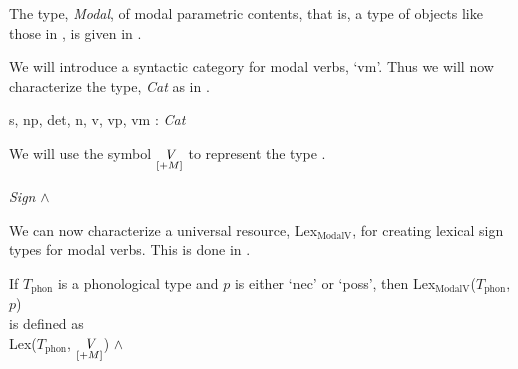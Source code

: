 The type, \textit{Modal}, of modal parametric contents, that is, a
type of objects like those in \preveg{}, is given in \nexteg{}.
\begin{ex} 
\end{ex} 

We will introduce a syntactic category for modal verbs, `vm'.  Thus we
will now characterize the type, \textit{Cat} as in \nexteg{}.
\begin{ex} 
s, np, det, n, v, vp, vm : \textit{Cat} 
\end{ex} 
We will use the symbol $\displaystyle\operatorname*{\textit{V}}_{[+M]}$ to represent the type
\nexteg{}.
\begin{ex} 
\textit{Sign} \d{$\wedge$}  
\end{ex} 
We can now characterize a universal resource, Lex$_{\mathrm{ModalV}}$,
for creating lexical sign types for modal verbs.  This is done in
\nexteg{}.
\begin{ex} 
If $T_{\mathrm{phon}}$ is a phonological type and $p$ is either `nec'
or `poss', then Lex$_{\mathrm{ModalV}}$($T_{\mathrm{phon}}$, $p$)\\
is defined as\\
Lex($T_{\mathrm{phon}}$, $\displaystyle\operatorname*{\textit{V}}_{[+M]}$) \d{$\wedge$}\\
\hspace*{2em}
\end{ex} 
         
